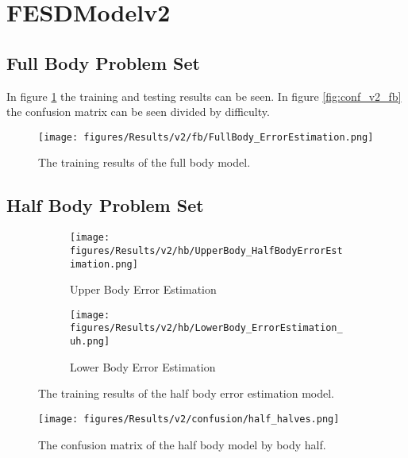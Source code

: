 
\section{FESDModelv2}

\subsection{Full Body Problem Set}
In figure \ref{fig:full_body_training_results_v2} the training and testing results can be seen. In figure \ref{fig:conf_v2_fb} the confusion matrix can be seen divided by difficulty.

\begin{figure}[ht]
  \centering
  \texttt{[image: figures/Results/v2/fb/FullBody\_ErrorEstimation.png]}
  \caption[Full Body model training results]{The training results of the full body model.}
  \label{fig:full_body_training_results_v2}
\end{figure}

\subsection{Half Body Problem Set}

\begin{figure}[ht]
  \centering
  \begin{subfigure}[b]{0.8\textwidth}
      \centering
      \texttt{[image: figures/Results/v2/hb/UpperBody\_HalfBodyErrorEstimation.png]}
      \caption{Upper Body Error Estimation}
      \label{fig:uh_ee}
  \end{subfigure}
  \hfill
  \begin{subfigure}[b]{0.8\textwidth}
      \centering
      \texttt{[image: figures/Results/v2/hb/LowerBody\_ErrorEstimation\_uh.png]}
      \caption{Lower Body Error Estimation}
      \label{fig:lh_ee}
  \end{subfigure}
  \caption[Half Body model training results]{The training results of the half body error estimation model.}
     \label{fig:half_body_training_results}
\end{figure}

\begin{figure}[ht]
  \centering
  \texttt{[image: figures/Results/v2/confusion/half\_halves.png]}
  \caption[half Body Confusion Matrix by Body Half]{The confusion matrix of the half body model by body half.}
  \label{fig:conf_v2_hb}
\end{figure}


